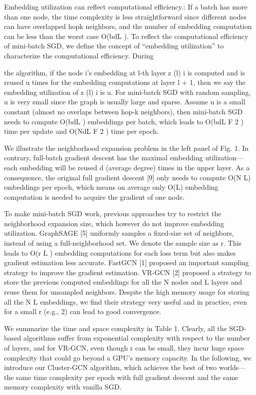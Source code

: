 \documentclass[
]{book}
\begin{document}
{{{Embedding utilization can reflect computational efficiency.: If a batch has more than one node, the time complexity is less straightforward since different nodes can have overlapped hopk neighbors, and the number of embedding computation can be less than the worst case O(bdL ). To reflect the computational efficiency of mini-batch SGD, we define the concept of ``embedding utilization'' to characterize the computational efficiency. During

the algorithm, if the node i's embedding at l-th layer z (l) i is computed and is reused u times for the embedding computations at layer l + 1, then we say the embedding utilization of z (l) i is u. For mini-batch SGD with random sampling, u is very small since the graph is usually large and sparse. Assume u is a small constant (almost no overlaps between hop-k neighbors), then mini-batch SGD needs to compute O(bdL ) embeddings per batch, which leads to O(bdL F 2 ) time per update and O(NdL F 2 ) time per epoch.

We illustrate the neighborhood expansion problem in the left panel of Fig. 1. In contrary, full-batch gradient descent has the maximal embedding utilization---each embedding will be reused d (average degree) times in the upper layer. As a consequence, the original full gradient descent {[}9{]} only needs to compute O(N L) embeddings per epoch, which means on average only O(L) embedding computation is needed to acquire the gradient of one node.

To make mini-batch SGD work, previous approaches try to restrict the neighborhood expansion size, which however do not improve embedding utilization. GraphSAGE {[}5{]} uniformly samples a fixed-size set of neighbors, instead of using a full-neighborhood set. We denote the sample size as r. This leads to O(r L ) embedding computations for each loss term but also makes gradient estimation less accurate. FastGCN {[}1{]} proposed an important sampling strategy to improve the gradient estimation. VR-GCN {[}2{]} proposed a strategy to store the previous computed embeddings for all the N nodes and L layers and reuse them for unsampled neighbors. Despite the high memory usage for storing all the N L embeddings, we find their strategy very useful and in practice, even for a small r (e.g., 2) can lead to good convergence.

We summarize the time and space complexity in Table 1. Clearly, all the SGD-based algorithms suffer from exponential complexity with respect to the number of layers, and for VR-GCN, even though r can be small, they incur huge space complexity that could go beyond a GPU's memory capacity. In the following, we introduce our Cluster-GCN algorithm, which achieves the best of two worlds--- the same time complexity per epoch with full gradient descent and the same memory complexity with vanilla SGD.

}}}
\end{document}

